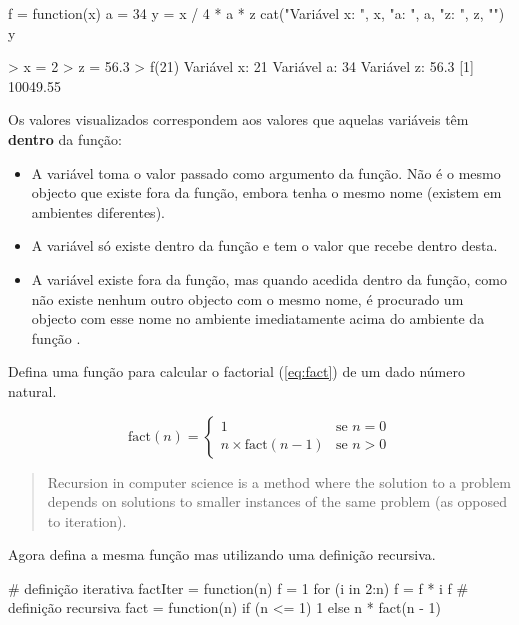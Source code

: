 \documentclass{exam}
\begin{document}
\begin{questions}
\begin{solution}
	\begin{rcode}
		f = function(x) {
			a = 34
			y = x / 4 * a * z
			cat("Variável x: ", x, " a: ", a, " z: ", z, "\n")
			y
		}
		
		> x = 2
		> z = 56.3
		> f(21)
		Variável x:  21 
		Variável a:  34 
		Variável z:  56.3 
		[1] 10049.55
	\end{rcode}
	Os valores visualizados correspondem aos valores que aquelas variáveis têm \textbf{dentro} da função:
	\begin{itemize}
		\item A variável  toma o valor passado como argumento da função. Não é o mesmo objecto que existe fora da função, embora tenha o mesmo nome (existem em ambientes diferentes).
		\item A variável  só existe dentro da função e tem o valor que recebe dentro desta.
		\item A variável  existe fora da função, mas quando acedida dentro da função, como não existe nenhum outro objecto com o mesmo nome, é procurado um objecto com esse nome no ambiente imediatamente acima do ambiente da função \rinline{f}.
	\end{itemize}
\end{solution}

\question Defina uma função para calcular o factorial (\autoref{eq:fact}) de um dado número natural.

\begin{equation}
\text{fact}(n) =
	\begin{cases}
		1 & \text{se } n = 0 \\
		n \times \text{fact}(n - 1) & \text{se } n > 0
	\end{cases}
	\label{eq:fact}
\end{equation}

\vspace{5mm}
\begin{quote}
	Recursion in computer science is a method where the solution to a problem depends on solutions to smaller instances of the same problem (as opposed to iteration).
\end{quote}
\vspace{5mm}

Agora defina a mesma função mas utilizando uma definição recursiva.

\begin{solution}
	\begin{rcode}
		# definição iterativa
		factIter = function(n) {
			f = 1
			for (i in 2:n) f = f * i
			f
		}
		# definição recursiva
		fact = function(n) {
			if (n <= 1) 1
			else n * fact(n - 1)
		}
	\end{rcode}
\end{solution}


\end{questions}
\end{document}
